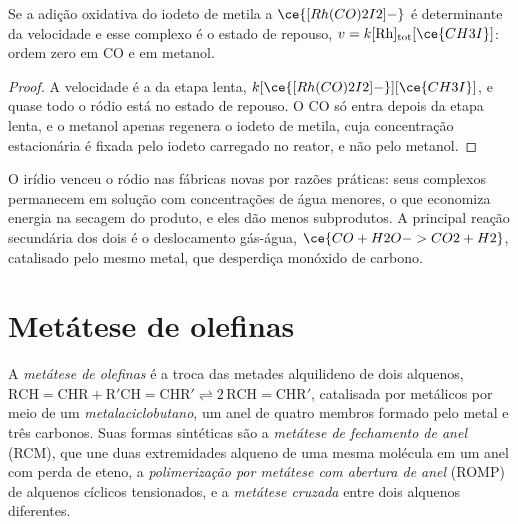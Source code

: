 \begin{proposition}\label{prop:b3:homogeneous-catalysis:monsanto-rate}
Se a adição oxidativa do iodeto de metila a $\ce{[Rh(CO)2I2]-}$ é determinante da velocidade e
esse complexo é o estado de repouso, $v = k[\mathrm{Rh}]_{\mathrm{tot}}[\ce{CH3I}]$: ordem zero em CO e em
metanol.
\end{proposition}

\begin{proof}
A velocidade é a da etapa lenta, $k[\ce{[Rh(CO)2I2]-}][\ce{CH3I}]$, e quase todo o ródio
está no estado de repouso. O CO só entra depois da etapa lenta, e o metanol apenas
regenera o iodeto de metila, cuja concentração estacionária é fixada pelo iodeto
carregado no reator, e não pelo metanol.
\end{proof}

O irídio venceu o ródio nas fábricas novas por razões práticas: seus complexos permanecem
em solução com concentrações de água menores, o que economiza energia na secagem do
produto, e eles dão menos subprodutos. A principal reação secundária dos dois é o
deslocamento gás-água, $\ce{CO + H2O -> CO2 + H2}$, catalisado pelo mesmo metal, que desperdiça
monóxido de carbono.

\section{Metátese de olefinas}

\begin{definition}\label{def:b3:homogeneous-catalysis:metathesis}
A \emph{metátese de olefinas} é a troca das
metades alquilideno de dois alquenos, $\mathrm{RCH{=}CHR + R'CH{=}CHR' \rightleftharpoons 2\,RCH{=}CHR'}$, catalisada por
 metálicos por meio de um \emph{metalaciclobutano},
um anel de quatro membros formado pelo metal e três carbonos. Suas formas sintéticas são
a \emph{metátese de fechamento de anel} (RCM), que une
duas extremidades alqueno de uma mesma molécula em um anel com perda de eteno,
a \emph{polimerização por metátese com abertura de anel}
(ROMP) de alquenos cíclicos tensionados, e a \emph{metátese
cruzada} entre dois alquenos diferentes.
\end{definition}

